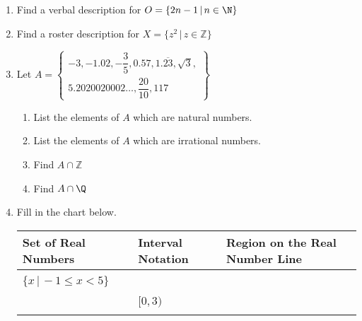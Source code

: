 \label{ExercisesforAppSetTheory}

\begin{enumerate}

\item  Find a verbal description for $O = \{ 2n-1 \, | \, n \in \N\}$

\item  Find a roster description for $X = \{ z^2 \, | \, z \in \mathbb{Z}\}$

\item  Let $A = \left\{ \begin{multlined} -3, -1.02, -\dfrac{3}{5}, 0.57, 1.\overline{23}, \sqrt{3}, \\ 5.2020020002 \ldots, \dfrac{20}{10}, 117 \end{multlined}  \right\} $

\begin{enumerate}

\item  List the elements of $A$ which are natural numbers.
\item  List the elements of $A$ which are irrational numbers.
\item  Find $A \cap \mathbb{Z}$
\item  Find $A \cap \Q$


\end{enumerate}


\item Fill in the chart below. 

\begin{center}
\begin{tabular}{|C|T|C|} \hline

Set of Real Numbers & Interval Notation &  Region on the Real Number Line  \\
\hline

& &  \\

 &  &  \\ \hline

& &  \\

 & \shortstack{$[0,3)$ \\ \hfill} &   \\ \hline


& &  \\


\end{tabular}
\end{center}
\end{enumerate}
